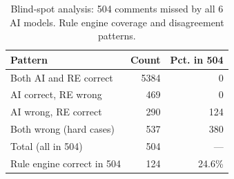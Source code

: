 \begin{table}[H]
\centering
\caption{Blind-spot analysis: 504 comments missed by all 6 AI models. Rule engine coverage and disagreement patterns.}
\label{tab:blind-spot-504}
\footnotesize
\begin{tabular}{lrr}
\toprule
Pattern & Count & Pct. in 504 \\
\midrule
Both AI and RE correct & 5384 & 0 \\
AI correct, RE wrong & 469 & 0 \\
AI wrong, RE correct & 290 & 124 \\
Both wrong (hard cases) & 537 & 380 \\
\midrule
Total (all in 504) & 504 & --- \\
Rule engine correct in 504 & 124 & 24.6\% \\
\bottomrule
\end{tabular}
\end{table}